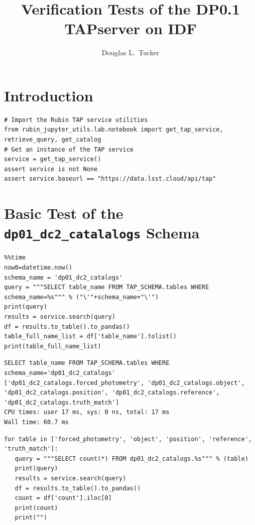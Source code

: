 \documentclass[DM,authoryear,toc]{lsstdoc}
\title{Verification Tests of the DP0.1 TAPserver on IDF}
\author{%
Douglas L.\ Tucker
}
\date{\vcsDate}
\begin{document}
\maketitle


\section{Introduction} \label{sec:intro}


\lstset{language=Python}
\begin{lstlisting}
# Import the Rubin TAP service utilities
from rubin_jupyter_utils.lab.notebook import get_tap_service, retrieve_query, get_catalog
# Get an instance of the TAP service
service = get_tap_service()
assert service is not None
assert service.baseurl == "https://data.lsst.cloud/api/tap"
\end{lstlisting}



\section{Basic Test of the \texttt{dp01\_dc2\_catalalogs} Schema} \label{sec:basic}

\lstset{language=Python}
\begin{lstlisting}
%%time
now0=datetime.now()
schema_name = 'dp01_dc2_catalogs'
query = """SELECT table_name FROM TAP_SCHEMA.tables WHERE schema_name=%s""" % ("\'"+schema_name+"\'")
print(query)
results = service.search(query)
df = results.to_table().to_pandas()
table_full_name_list = df['table_name'].tolist()
print(table_full_name_list)
\end{lstlisting}

\lstset{language=Python}
\begin{lstlisting}
SELECT table_name FROM TAP_SCHEMA.tables WHERE schema_name='dp01_dc2_catalogs'
['dp01_dc2_catalogs.forced_photometry', 'dp01_dc2_catalogs.object', 'dp01_dc2_catalogs.position', 'dp01_dc2_catalogs.reference', 'dp01_dc2_catalogs.truth_match']
CPU times: user 17 ms, sys: 0 ns, total: 17 ms
Wall time: 60.7 ms
\end{lstlisting}



\lstset{language=Python}
\begin{lstlisting}
for table in ['forced_photometry', 'object', 'position', 'reference', 'truth_match']:
   query = """SELECT count(*) FROM dp01_dc2_catalogs.%s""" % (table)
   print(query)
   results = service.search(query)
   df = results.to_table().to_pandas()
   count = df['count'].iloc[0]
   print(count)
   print("")
\end{lstlisting}
\end{document}
